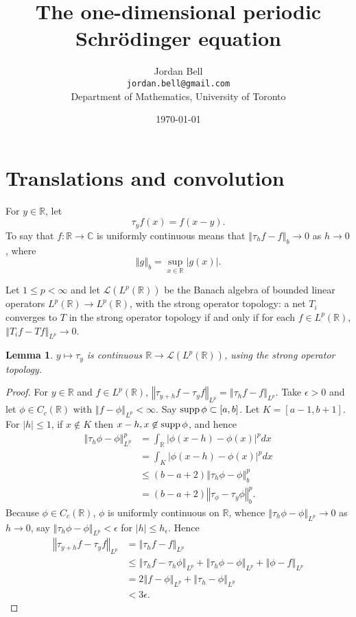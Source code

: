 \documentclass{article}
\newcommand{\supp}{\ensuremath\mathrm{supp}\,}
\newcommand{\norm}[1]{\left\Vert #1 \right\Vert}
\newtheorem{lemma}[theorem]{Lemma}
\theoremstyle{definition}
\begin{document}
\title{The one-dimensional periodic Schr\"odinger equation}
\author{Jordan Bell\\ \texttt{jordan.bell@gmail.com}\\Department of Mathematics, University of Toronto}
\date{\today}

\maketitle


\section{Translations and convolution}
For $y \in \mathbb{R}$, let
\[
\tau_y f(x) =  f(x-y).
\]
To say that $f:\mathbb{R} \to \mathbb{C}$ is uniformly continuous means that
$\norm{\tau_h f-f}_b \to 0$ as $h \to 0$, where
\[
\norm{g}_b = \sup_{x \in \mathbb{R}} |g(x)|.
\]

Let $1 \leq p < \infty$ and
let $\mathscr{L}(L^p(\mathbb{R}))$ be the Banach algebra
of bounded linear operators $L^p(\mathbb{R}) \to L^p(\mathbb{R})$, with the strong operator topology:
a net $T_i$ converges to $T$ in the strong operator topology if and only if
for each $f \in L^p(\mathbb{R})$, $\norm{T_i f - Tf}_{L^p} \to 0$. 

\begin{lemma}
$y \mapsto \tau_y$ is continuous 
$\mathbb{R} \to \mathscr{L}(L^p(\mathbb{R}))$, using the strong operator
topology.
\end{lemma}
\begin{proof}
For $y \in \mathbb{R}$ and $f \in L^p(\mathbb{R})$, 
$\norm{\tau_{y+h} f - \tau_y f}_{L^p} = \norm{\tau_h f - f}_{L^p}$.
Take $\epsilon>0$ and 
let $\phi \in C_c(\mathbb{R})$ with $\norm{f-\phi}_{L^p}<\infty$.
Say $\supp \phi \subset [a,b]$. 
Let $K=[a-1,b+1]$. For $|h| \leq 1$, if $x \notin K$ then
$x-h,x \not \in \supp \phi$, and hence 
\begin{align*}
\norm{\tau_h \phi- \phi}_{L^p}^p& = \int_{\mathbb{R}} |\phi(x-h)-\phi(x)|^p dx\\
&=\int_K  |\phi(x-h)-\phi(x)|^p dx\\
&\leq (b-a+2) \norm{\tau_h \phi -  \phi}_b^p\\
&=(b-a+2) \norm{\tau_ \phi - \tau_y \phi}_b^p.
\end{align*}
Because $\phi \in C_c(\mathbb{R})$, $\phi$ is uniformly continuous on $\mathbb{R}$, whence 
$\norm{\tau_h \phi- \phi}_{L^p} \to 0$ as $h \to 0$, say 
$\norm{\tau_h \phi-\phi}_{L^p} < \epsilon$ for $|h| \leq h_\epsilon$. 
Hence
\begin{align*}
\norm{\tau_{y+h} f - \tau_y f}_{L^p} &= \norm{\tau_h f - f}_{L^p}\\
&\leq \norm{\tau_h f - \tau_h \phi}_{L^p} + \norm{\tau_h \phi - \phi}_{L^p} + \norm{\phi-f}_{L^p}\\
&=2 \norm{f-\phi}_{L^p} + \norm{\tau_h - \phi}_{L^p}\\
&<3\epsilon.
\end{align*}
\end{proof}
\end{document}
